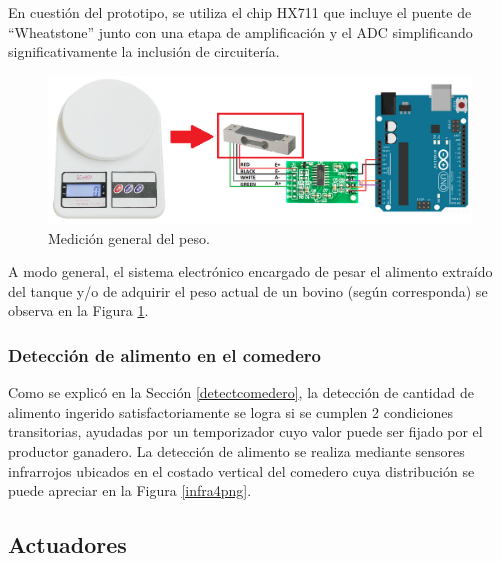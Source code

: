     En cuestión del prototipo, se utiliza el chip HX711 que incluye el puente de ``Wheatstone'' junto con una etapa de amplificación y el ADC simplificando significativamente la inclusión de circuitería.
    
    \begin{figure}[H]
	    \begin{center}
	    	\includegraphics[scale=0.70]{img/pesaje.png}
        \end{center}
	    \caption{Medición general del peso. \label{pesajepng}}
    \end{figure}
    
    A modo general, el sistema electrónico encargado de pesar el alimento extraído del tanque y/o de adquirir el peso actual de un bovino (según corresponda) se observa en la Figura \ref{pesajepng}.


\subsubsection{Detección de alimento en el comedero}

Como se explicó en la Sección \ref{detectcomedero}, la detección de cantidad de alimento ingerido satisfactoriamente se logra si se cumplen 2 condiciones transitorias, ayudadas por un temporizador cuyo valor puede ser fijado por el productor ganadero. La detección de alimento se realiza mediante sensores infrarrojos ubicados en el costado vertical del comedero cuya distribución se puede apreciar en la Figura \ref{infra4png}.

\subsection{Actuadores}
